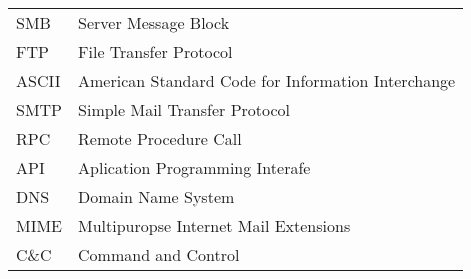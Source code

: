 
\seznamzkr

\begin{tabular}{ll}
	SMB		& Server Message Block\\	
	FTP		& File Transfer Protocol\\
	ASCII	& American Standard Code for Information Interchange\\
	SMTP		& Simple Mail Transfer Protocol\\
	RPC		& Remote Procedure Call\\
	API 		& Aplication Programming Interafe\\
	DNS		& Domain Name System \\
	MIME		& Multipuropse Internet Mail Extensions\\
	C\&C		& Command and Control\\

\end{tabular}

